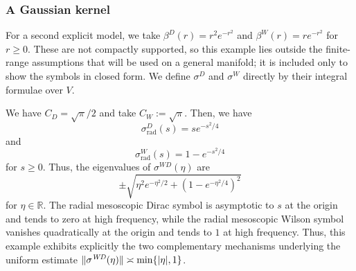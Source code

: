 \documentclass[a4paper,oneside,12pt]{amsart}
\theoremstyle{plain}
\theoremstyle{definition}
\theoremstyle{remark}
\newcommand{\R}{\mathbb{R}}
\DeclarePairedDelimiter{\abs}{\lvert}{\rvert}
\DeclarePairedDelimiter{\norm}{\lVert}{\rVert}
\newcommand{\cutoff}{\beta}
\newcommand{\cutoffDirac}{\cutoff^D}
\newcommand{\cutoffWilson}{\cutoff^W}
\newcommand{\symbolDirac}{\sigma^D}
\newcommand{\symbolWilson}{\sigma^W}
\newcommand{\symbolWilsonDirac}{\sigma^{\mathit{WD}}}
\newcommand{\radialsymbolDirac}{\symbolDirac_{\mathrm{rad}}}
\newcommand{\radialsymbolWilson}{\symbolWilson_{\mathrm{rad}}}
\begin{document}
\subsubsection{A Gaussian kernel}

For a second explicit model, we take $\cutoffDirac(r) = r^2e^{-r^2}$ and $\cutoffWilson(r) = r e^{-r^2}$ for $r \ge 0$.
These are not compactly supported, so this example lies outside the finite-range assumptions that will be used on a general manifold; it is included only to show the symbols in closed form.
We define $\symbolDirac$ and $\symbolWilson$ directly by their integral formulae over $V$.

We have $C_D = \sqrt{\pi}/2$ and take $C_W := \sqrt{\pi}$.
Then, we have
\begin{equation}
  \radialsymbolDirac(s) = s e^{-s^2/4}
\end{equation}
and
\begin{equation}
  \radialsymbolWilson(s) = 1 - e^{-s^2/4}
\end{equation}
for $s \ge 0$.
Thus, the eigenvalues of $\symbolWilsonDirac(\eta)$ are
\begin{equation}
  \pm \sqrt{\eta^2 e^{-\eta^2/2} + (1-e^{-\eta^2/4})^2}
\end{equation}
for $\eta \in \R$.
The radial mesoscopic Dirac symbol is asymptotic to $s$ at the origin and tends to zero at high frequency, while the radial mesoscopic Wilson symbol vanishes quadratically at the origin and tends to $1$ at high frequency.
Thus, this example exhibits explicitly the two complementary mechanisms underlying the uniform estimate $\norm{\symbolWilsonDirac(\eta)} \asymp \min\{\abs{\eta},1\}$.
\end{document}
